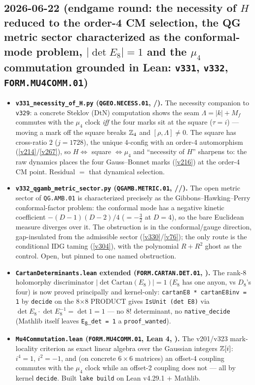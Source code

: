 \subsection*{2026-06-22 (endgame round: the necessity of $H$ reduced to the order-4 CM selection, the QG metric sector characterized as the conformal-mode problem, $|\det E_8|{=}1$ and the $\mu_4$ commutation grounded in Lean: \texttt{v331}, \texttt{v332}, \texttt{FORM.MU4COMM.01})}
\begin{itemize}
\item \textbf{\texttt{v331\_necessity\_of\_H.py} (\texttt{QGEO.NECESS.01}, \mE/\mO).} The necessity companion to
  \texttt{v329}: a concrete Steklov (DtN) computation shows the seam $\Lambda{=}|k|{+}M_f$ commutes with the $\mu_4$
  clock \emph{iff} the four marks sit at the square ($\tau{=}i$) --- moving a mark off the square breaks $\mathbb{Z}_4$ and
  $[\rho,\Lambda]\neq0$.  The square has cross-ratio $2$ ($j{=}1728$), the unique $4$-config with an order-4
  automorphism (\vref{v214}/\vref{v267}), so $H\Leftrightarrow$ square $\Leftrightarrow\mu_4$ and ``necessity of
  $H$'' sharpens to: the raw dynamics places the four Gauss--Bonnet marks (\vref{v216}) at the order-4 CM point.
  Residual $=$ that dynamical selection.
\item \textbf{\texttt{v332\_qgamb\_metric\_sector.py} (\texttt{QGAMB.METRIC.01}, \mE/\mC/\mO).} The open metric sector
  of \texttt{QG.AMB.01} is characterized precisely as the Gibbons--Hawking--Perry conformal-factor problem: the
  conformal mode has a negative kinetic coefficient $-(D{-}1)(D{-}2)/4$ (${=}-\tfrac32$ at $D{=}4$), so the bare
  Euclidean measure diverges over it.  The obstruction is in the conformal/gauge direction, gap-insulated from the
  admissible sector (\vref{v330}/\vref{v76}); the only route is the conditional IDG taming (\vref{v304}), with the
  polynomial $R{+}R^2$ ghost as the control.  Open, but pinned to one named obstruction.
\item \textbf{\texttt{CartanDeterminants.lean} extended (\texttt{FORM.CARTAN.DET.01}, \mE).} The rank-8 holomorphy
  discriminator $|\det\mathrm{Cartan}(E_8)|{=}1$ ($E_8$ has one anyon, vs $D_8$'s four) is now proved principally and
  kernel-only: \texttt{cartanE8 * cartanE8inv = 1} by \texttt{decide} on the 8$\times$8 PRODUCT gives
  \texttt{IsUnit (det E8)} via $\det E_8\cdot\det E_8^{-1}{=}\det 1{=}1$ --- no 8! determinant, no
  \texttt{native\_decide} (Mathlib itself leaves \texttt{E\textsubscript{8}\_det = 1} a \texttt{proof\_wanted}).
\item \textbf{\texttt{Mu4Commutation.lean} (\texttt{FORM.MU4COMM.01}, Lean 4, \mE).} The v201/v323 mark-locality
  criterion as exact linear algebra over the Gaussian integers $\mathbb{Z}[i]$: $i^4{=}1$, $i^2{=}-1$, and (on concrete
  $6\times6$ matrices) an offset-4 coupling commutes with the $\mu_4$ clock while an offset-2 coupling does not ---
  all by kernel \texttt{decide}.  Built \texttt{lake build} on Lean v4.29.1 $+$ Mathlib.
\end{itemize}

